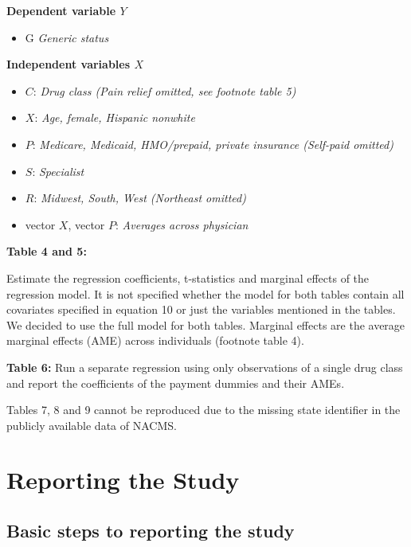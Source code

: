 \documentclass[
]{book}
\providecommand{\tightlist}{%
  \setlength{\itemsep}{0pt}\setlength{\parskip}{0pt}}
\begin{document}
\textbf{Dependent variable \(Y\)}

\begin{itemize}
\tightlist
\item
  G \emph{Generic status}
\end{itemize}

\textbf{Independent variables \(X\)}

\begin{itemize}
\tightlist
\item
  \(C\): \emph{Drug class (Pain relief omitted, see footnote table 5)}
\item
  \(X\): \emph{Age, female, Hispanic nonwhite}
\item
  \(P\): \emph{Medicare, Medicaid, HMO/prepaid, private insurance
  (Self-paid omitted)}
\item
  \(S\): \emph{Specialist}
\item
  \(R\): \emph{Midwest, South, West (Northeast omitted)}
\item
  vector \(X\), vector \(P\): \emph{Averages across physician}
\end{itemize}

\textbf{Table 4 and 5:}

Estimate the regression coefficients, t-statistics and marginal effects
of the regression model. It is not specified whether the model for both
tables contain all covariates specified in equation 10 or just the
variables mentioned in the tables. We decided to use the full model for
both tables. Marginal effects are the average marginal effects (AME)
across individuals (footnote table 4).

\textbf{Table 6:} Run a separate regression using only observations of a
single drug class and report the coefficients of the payment dummies and
their AMEs.

Tables 7, 8 and 9 cannot be reproduced due to the missing state
identifier in the publicly available data of NACMS.

\hypertarget{report-study}{%
\chapter{Reporting the Study}\label{report-study}}

\hypertarget{basic-steps-to-reporting-the-study}{%
\section{Basic steps to reporting the
study}\label{basic-steps-to-reporting-the-study}}
\end{document}
